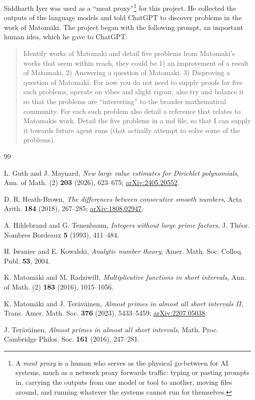 \documentclass[11pt,a4paper]{amsart}
\theoremstyle{definition}
\newcommand{\1}{\mathbf 1}
\begin{document}
Siddharth Iyer was used as a ``meat proxy''\footnote{A \emph{meat proxy}
is a human who serves as the physical go-between for AI systems, much as a
network proxy forwards traffic: typing or pasting prompts in, carrying the
outputs from one model or tool to another, moving files around, and
running whatever the systems cannot run for themselves.} for this project.
He collected the outputs of the language models and told ChatGPT to
discover problems in the work of Matom\"aki.  The project began with the
following prompt, an important human idea, which he gave to ChatGPT:
\begin{quote}\small
Identify works of Matomaki and detail five problems from Matomaki's works
that seem within reach, they could be 1) an improvement of a result of
Matomaki, 2) Answering a question of Matomaki, 3) Disproving a question of
Matomaki.  For now you do not need to supply proofs for five such problems,
operate on vibes and slight rigour, also try and balance it so that the
problems are ``interesting'' to the broader mathematical community.  For
each such problem also detail a reference that relates to Matomakis work.
Detail the five problems in a md file, so that I can supply it towards
future agent runs (that actually attempt to solve some of the problems).
\end{quote}

\begin{thebibliography}{99}

L. Guth and J. Maynard,
\emph{New large value estimates for Dirichlet polynomials},
Ann. of Math. (2) \textbf{203} (2026), 623--675;
\href{https://arxiv.org/abs/2405.20552}{arXiv:2405.20552}.

D. R. Heath-Brown,
\emph{The differences between consecutive smooth numbers},
Acta Arith. \textbf{184} (2018), 267--285;
\href{https://arxiv.org/abs/1808.02947}{arXiv:1808.02947}.

A. Hildebrand and G. Tenenbaum,
\emph{Integers without large prime factors},
J. Th\'eor. Nombres Bordeaux \textbf{5} (1993), 411--484.

H. Iwaniec and E. Kowalski,
\emph{Analytic number theory},
Amer. Math. Soc. Colloq. Publ. \textbf{53}, 2004.

K. Matom\"aki and M. Radziwi\l\l,
\emph{Multiplicative functions in short intervals},
Ann. of Math. (2) \textbf{183} (2016), 1015--1056.

K. Matom\"aki and J. Ter\"av\"ainen,
\emph{Almost primes in almost all short intervals II},
Trans. Amer. Math. Soc. \textbf{376} (2023), 5433--5459;
\href{https://arxiv.org/abs/2207.05038}{arXiv:2207.05038}.

J. Ter\"av\"ainen,
\emph{Almost primes in almost all short intervals},
Math. Proc. Cambridge Philos. Soc. \textbf{161} (2016), 247--281.

\end{thebibliography}
\end{document}
